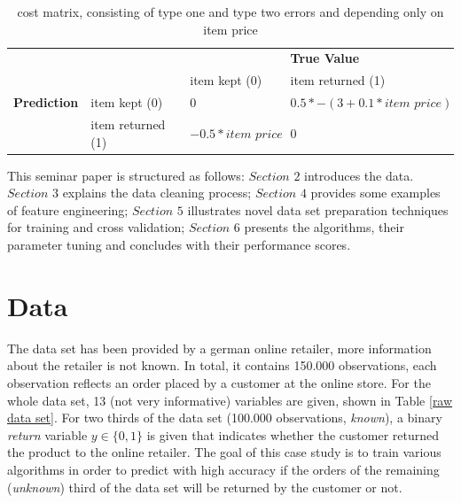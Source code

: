 \documentclass[a4paper,12pt]{article}
\begin{document}
\begin{table}[h]
 \begin{tabular}{l  l | l l}
  & & & \textbf{True Value} \\
  & & item kept (0) & item returned (1) \\
  \hline
  \textbf{Prediction} & item kept (0) & 0 & $0.5*-(3+0.1*\textit{item price})$ \\
  & item returned (1) & $-0.5 * \textit{item price}$ & 0 
 \end{tabular}
 \caption{cost matrix, consisting of type one and type two errors and depending only on item price}
 \label{cost matrix}
\end{table}

\newpage

This seminar paper is structured as follows: $Section$ $2$ introduces the data. $Section$ $3$ explains the data cleaning process; $Section$ $4$ provides some examples of feature engineering; $Section$ $5$ illustrates novel data set preparation techniques for training and cross validation; $Section$ $6$ presents the algorithms, their parameter tuning and concludes with their performance scores.

\section{Data}
The data set has been provided by a german online retailer, more information about the retailer is not known. In total, it contains 150.000 observations, each observation reflects an order placed by a customer at the online store. For the whole data set, 13 (not very informative) variables are given, shown in Table \ref{raw data set}. For two thirds of the data set (100.000 observations, \textit{known}), a binary \textit{return} variable $y \in \{0,1\}$ is given that indicates whether the customer returned the product to the online retailer. The goal of this case study is to train various algorithms in order to predict with high accuracy if the orders of the remaining (\textit{unknown}) third of the data set will be returned by the customer or not. 
\end{document}
